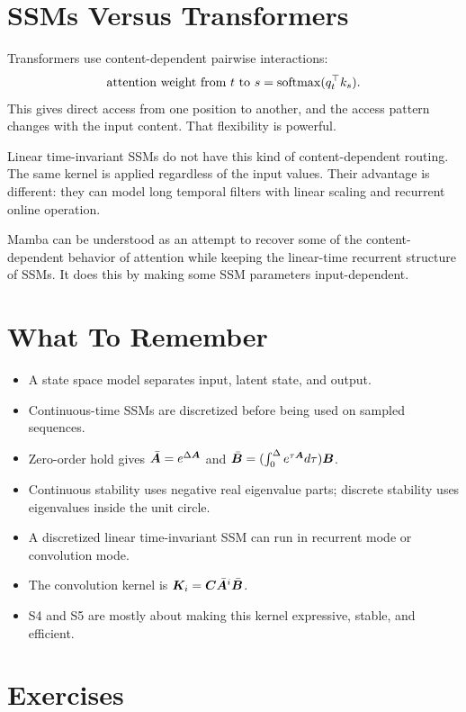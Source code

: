 \section{SSMs Versus Transformers}

Transformers use content-dependent pairwise interactions:
\[
  \text{attention weight from } t \text{ to } s
  =
  \operatorname{softmax}(q_t^\top k_s).
\]
This gives direct access from one position to another, and the access pattern changes
with the input content. That flexibility is powerful.

Linear time-invariant SSMs do not have this kind of content-dependent routing. The same
kernel is applied regardless of the input values. Their advantage is different: they can
model long temporal filters with linear scaling and recurrent online operation.

Mamba can be understood as an attempt to recover some of the content-dependent behavior
of attention while keeping the linear-time recurrent structure of SSMs. It does this by
making some SSM parameters input-dependent.

\section{What To Remember}

\begin{itemize}
  \item A state space model separates input, latent state, and output.
  \item Continuous-time SSMs are discretized before being used on sampled sequences.
  \item Zero-order hold gives
  $\bar{\bm{A}}=e^{\Delta\bm{A}}$ and
  $\bar{\bm{B}}=(\int_0^\Delta e^{\tau\bm{A}}d\tau)\bm{B}$.
  \item Continuous stability uses negative real eigenvalue parts; discrete stability uses
  eigenvalues inside the unit circle.
  \item A discretized linear time-invariant SSM can run in recurrent mode or convolution
  mode.
  \item The convolution kernel is $\bm{K}_i=\bm{C}\bar{\bm{A}}^i\bar{\bm{B}}$.
  \item S4 and S5 are mostly about making this kernel expressive, stable, and efficient.
\end{itemize}

\section{Exercises}

